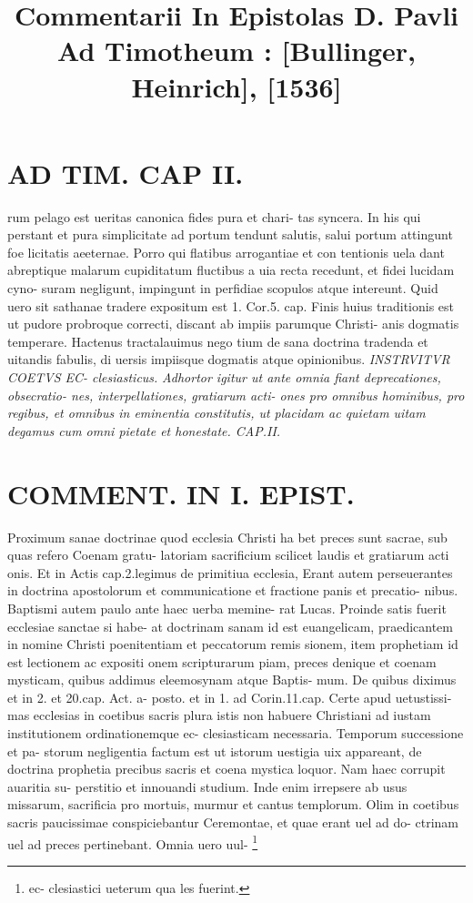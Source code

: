 \documentclass{article}
\begin{document}
\date{}
        \title{Commentarii In Epistolas D. Pavli Ad Timotheum : [Bullinger, Heinrich], [1536]}
\maketitle

\begin{pages} 
\beginnumbering
        
\section*{AD TIM. CAP II. }
\marginpar{[ p.107 ]}\pstart rum pelago est ueritas canonica fides pura et chari- tas syncera. In his qui perstant et pura simplicitate ad portum tendunt salutis, salui portum attingunt foe licitatis aeeternae. Porro qui flatibus arrogantiae et con tentionis uela dant abreptique malarum cupiditatum fluctibus a uia recta recedunt, et fidei lucidam cyno- suram negligunt, impingunt in perfidiae scopulos atque intereunt. Quid uero sit sathanae tradere expositum est 1. Cor.5. cap. Finis huius traditionis est ut pudore probroque correcti, discant ab impiis parumque Christi- anis dogmatis temperare. Hactenus tractalauimus nego tium de sana doctrina tradenda et uitandis fabulis, di uersis impiisque dogmatis atque opinionibus.  \pend
\textit{INSTRVITVR COETVS EC- clesiasticus. }
\textit{Adhortor igitur ut ante omnia fiant deprecationes, obsecratio- nes, interpellationes, gratiarum acti- ones pro omnibus hominibus, pro regibus, et omnibus in eminentia constitutis, ut placidam ac quietam uitam degamus cum omni pietate et honestate. CAP.II. }
\section*{COMMENT. IN I. EPIST. }\pstart Proximum sanae doctrinae quod ecclesia Christi ha bet preces sunt sacrae, sub quas refero Coenam gratu- latoriam sacrificium scilicet laudis et gratiarum acti onis. Et in Actis cap.2.legimus de primitiua ecclesia, Erant autem perseuerantes in doctrina apostolorum et communicatione et fractione panis et precatio- nibus. Baptismi autem paulo ante haec uerba memine- rat Lucas. Proinde satis fuerit ecclesiae sanctae si habe- at doctrinam sanam id est euangelicam, praedicantem in nomine Christi poenitentiam et peccatorum remis sionem, item prophetiam id est lectionem ac expositi onem scripturarum piam, preces denique et coenam mysticam, quibus addimus eleemosynam atque Baptis- mum. De quibus diximus et in 2. et 20.cap. Act. a- posto. et in 1. ad Corin.11.cap. Certe apud uetustissi- mas ecclesias in coetibus sacris plura istis non habuere Christiani ad iustam institutionem ordinationemque ec- clesiasticam necessaria. Temporum successione et pa- storum negligentia factum est ut istorum uestigia uix appareant, de doctrina prophetia precibus sacris et coena mystica loquor. Nam haec corrupit auaritia su- perstitio et innouandi studium. Inde enim irrepsere ab usus missarum, sacrificia pro mortuis, murmur et cantus templorum. Olim in coetibus sacris paucissimae conspiciebantur Ceremontae, et quae erant uel ad do- ctrinam uel ad preces pertinebant. Omnia uero uul-  \pend\footnote{\footnotesizeCoetus ec- clesiastici ueterum qua les fuerint. }

\end{pages}
\end{document}
